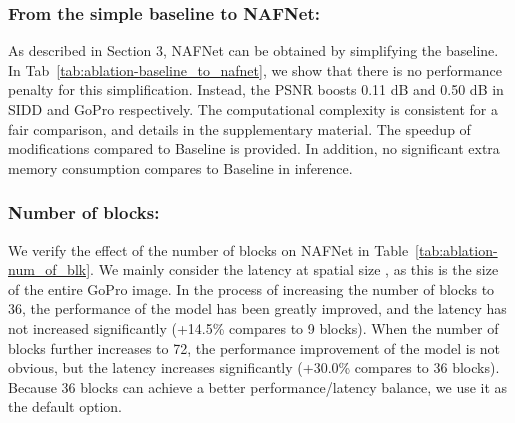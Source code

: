 \documentclass[runningheads]{llncs}
\begin{document}
\subsubsection{From the simple baseline to NAFNet:} As described in Section 3, NAFNet can be obtained by simplifying the baseline. 
In Tab~\ref{tab:ablation-baseline_to_nafnet}, we show that there is no performance penalty for this simplification. Instead, the PSNR boosts 0.11 dB and 0.50 dB in SIDD and GoPro respectively.
The computational complexity is consistent for a fair comparison, and details in the supplementary material.  The speedup of modifications compared to Baseline is provided. In addition, no significant extra memory consumption compares to Baseline in inference.


\subsubsection{Number of blocks:} 
We verify the effect of the number of blocks on NAFNet in Table~\ref{tab:ablation-num_of_blk}. We mainly consider the latency at spatial size , as this is the size of the entire GoPro image.
In the process of increasing the number of blocks to 36, the performance of the model has been greatly improved, and the latency has not increased significantly (+14.5\% compares to 9 blocks). When the number of blocks further increases to 72, the performance improvement of the model is not obvious, but the latency increases significantly (+30.0\% compares to 36 blocks). Because 36 blocks can achieve a better performance/latency balance, we use it as the default option.
\end{document}
